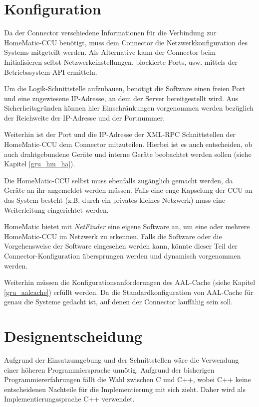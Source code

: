 \section{Konfiguration}
\label{ana_konfiguration}

Da der Connector verschiedene Informationen für die Verbindung zur HomeMatic-CCU benötigt,
muss dem Connector die Netzwerkkonfiguration des Systems mitgeteilt werden.
Als Alternative kann der Connector beim Initialisieren selbst Netzwerkeinstellungen,
blockierte Ports, usw. mittels der Betriebssystem-API ermitteln.

Um die Logik-Schnittstelle aufzubauen, benötigt die Software einen freien Port und
eine zugewiesene IP-Adresse, an dem der Server bereitgestellt wird.
Aus Sicherheitsgründen können hier Einschränkungen vorgenommen werden bezüglich
der Reichweite der IP-Adresse und der Portnummer.

Weiterhin ist der Port und die IP-Adresse der XML-RPC Schnittstellen der HomeMatic-CCU
dem Connector mitzuteilen.
Hierbei ist es auch entscheiden, ob auch drahtgebundene Geräte und interne Geräte
beobachtet werden sollen (siehe Kapitel \ref{gru_hm_ha}).

Die HomeMatic-CCU selbst muss ebenfalls zugänglich gemacht werden, da Geräte an ihr
angemeldet werden müssen.
Falls eine enge Kapselung der CCU an das System besteht (z.B. durch ein privates
kleines Netzwerk) muss eine Weiterleitung eingerichtet werden.

HomeMatic bietet mit \emph{NetFinder} eine eigene Software an, um eine oder mehrere
HomeMatic-CCU im Netzwerk zu erkennen.
Falls die Software oder die Vorgehensweise der Software eingesehen werden kann,
könnte dieser Teil der Connector-Konfiguration übersprungen werden und dynamisch
vorgenommen werden.

Weiterhin müssen die Konfigurationsanforderungen des AAL-Cache
(siehe Kapitel \ref{gru_aalcache}) erfüllt werden.
Da die Standardkonfiguration von AAL-Cache für genau die Systeme
gedacht ist, auf denen der Connector lauffähig sein soll.

\section{Designentscheidung}
\label{ana_entscheidungen}

Aufgrund der Einsatzumgebung und der Schnittstellen wäre die Verwendung einer höheren
Programmiersprache unnötig.
Aufgrund der bisherigen Programmiererfahrungen fällt die Wahl zwischen C und C++, wobei
C++ keine entscheidenen Nachteile für die Implementierung mit sich zieht.
Daher wird als Implementierungssprache C++ verwendet.

